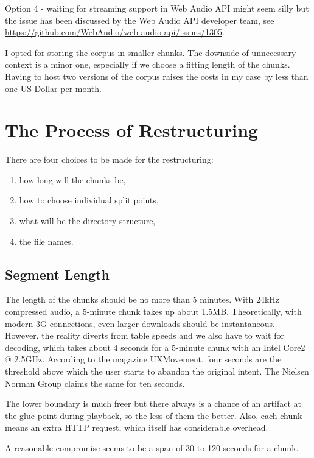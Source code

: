 \documentclass[conference]{IEEEtran}
\begin{document}
Option 4 - waiting for streaming support in Web Audio API might seem silly but
the issue has been discussed by the Web Audio API developer team, see
\url{https://github.com/WebAudio/web-audio-api/issues/1305}.

I opted for storing the corpus in smaller chunks. The downside of unnecessary
context is a minor one, especially if we choose a fitting length of the chunks.
Having to host two versions of the corpus raises the costs in my case by less
than one US Dollar per month.

\section{The Process of Restructuring}

There are four choices to be made for the restructuring: 
\begin{enumerate}
    \item{how long will the chunks be,}
    \item{how to choose individual split points,}
    \item{what will be the directory structure,}
    \item{the file names.}
\end{enumerate}

\subsection{Segment Length}

The length of the chunks should be no more than 5 minutes. With 24kHz
compressed audio, a 5-minute chunk takes up about 1.5MB. Theoretically, with
modern 3G connections, even larger downloads should be instantaneous. However,
the reality diverts from table speeds and we also have to wait for decoding,
which takes about 4 seconds for a 5-minute chunk with an Intel Core2 @ 2.5GHz.
According to the magazine UXMovement\cite{foursecondrule}, four seconds are the
threshold above which the user starts to abandon the original intent. The Nielsen
Norman Group\cite{websiteresponsetimes} claims the same for ten seconds.

The lower boundary is much freer but there always is a chance of an artifact at
the glue point during playback, so the less of them the better. Also, each chunk
means an extra HTTP request, which itself has considerable overhead.

A reasonable compromise seems to be a span of 30 to 120 seconds for a chunk.
\end{document}
